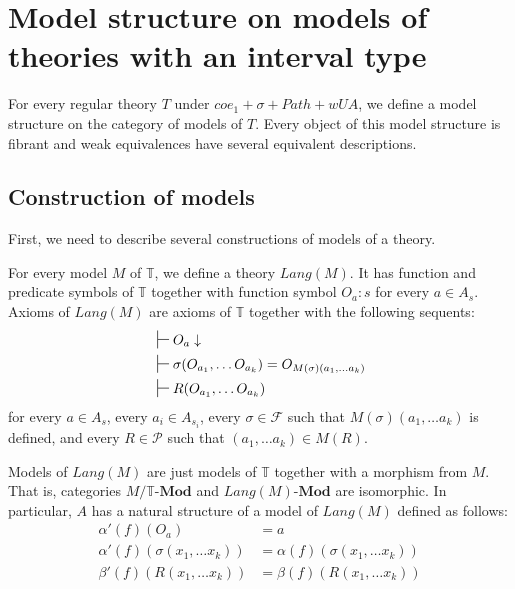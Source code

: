 \documentclass[reqno]{amsart}
\theoremstyle{definition}
\theoremstyle{remark}
\newcommand{\cat}[1]{\mathbf{#1}}
\newcommand{\Mod}[1]{#1\text{-}\cat{Mod}}
\numberwithin{figure}{section}
\begin{document}
\section{Model structure on models of theories with an interval type}

For every regular theory $T$ under $coe_1 + \sigma + Path + wUA$, we define a model structure on the category of models of $T$.
Every object of this model structure is fibrant and weak equivalences have several equivalent descriptions.

\subsection{Construction of models}

First, we need to describe several constructions of models of a theory.

For every model $M$ of $\mathbb{T}$, we define a theory $Lang(M)$.
It has function and predicate symbols of $\mathbb{T}$ together with function symbol $O_a : s$ for every $a \in A_s$.
Axioms of $Lang(M)$ are axioms of $\mathbb{T}$ together with the following sequents:
\begin{align*}
& \sststile{}{} O_a \downarrow \\
& \sststile{}{} \sigma(O_{a_1}, \ldots O_{a_k}) = O_{M(\sigma)(a_1, \ldots a_k)} \\
& \sststile{}{} R(O_{a_1}, \ldots O_{a_k})
\end{align*}
for every $a \in A_s$, every $a_i \in A_{s_i}$,
every $\sigma \in \mathcal{F}$ such that $M(\sigma)(a_1, \ldots a_k)$ is defined,
and every $R \in \mathcal{P}$ such that $(a_1, \ldots a_k) \in M(R)$.

Models of $Lang(M)$ are just models of $\mathbb{T}$ together with a morphism from $M$.
That is, categories $M/\Mod{\mathbb{T}}$ and $\Mod{Lang(M)}$ are isomorphic.
In particular, $A$ has a natural structure of a model of $Lang(M)$ defined as follows:
\begin{align*}
\alpha'(f)(O_a) & = a \\
\alpha'(f)(\sigma(x_1, \ldots x_k)) & = \alpha(f)(\sigma(x_1, \ldots x_k)) \\
\beta'(f)(R(x_1, \ldots x_k)) & = \beta(f)(R(x_1, \ldots x_k))
\end{align*}
\end{document}
